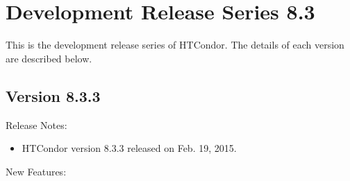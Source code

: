 
\section{\label{sec:History-8-3}Development Release Series 8.3}

This is the development release series of HTCondor.
The details of each version are described below.

\subsection*{\label{sec:New-8-3-3}Version 8.3.3}

\noindent Release Notes:

\begin{itemize}

\item HTCondor version 8.3.3 released on Feb. 19, 2015.

\end{itemize}


\noindent New Features:

